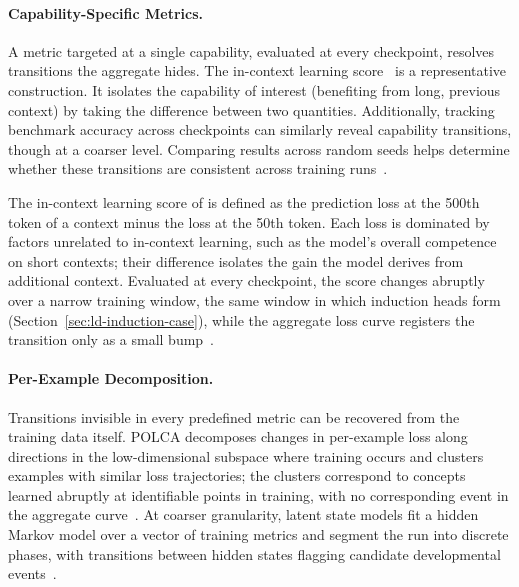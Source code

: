 \paragraph{Capability-Specific Metrics.} A metric targeted at a single capability, evaluated at every checkpoint, resolves transitions the aggregate hides. The in-context learning score~ is a representative construction. It isolates the capability of interest (benefiting from long, previous context) by taking the difference between two quantities. Additionally, tracking benchmark accuracy across checkpoints can similarly reveal capability transitions, though at a coarser level. Comparing results across random seeds helps determine whether these transitions are consistent across training runs~.

\begin{examplebox}
The in-context learning score of  is defined as the prediction loss at the 500th token of a context minus the loss at the 50th token. Each loss is dominated by factors unrelated to in-context learning, such as the model's overall competence on short contexts; their difference isolates the gain the model derives from additional context. Evaluated at every checkpoint, the score changes abruptly over a narrow training window, the same window in which induction heads form (Section~\ref{sec:ld-induction-case}), while the aggregate loss curve registers the transition only as a small bump~.
\end{examplebox}

\paragraph{Per-Example Decomposition.} Transitions invisible in every predefined metric can be recovered from the training data itself. POLCA decomposes changes in per-example loss along directions in the low-dimensional subspace where training occurs and clusters examples with similar loss trajectories; the clusters correspond to concepts learned abruptly at identifiable points in training, with no corresponding event in the aggregate curve~. At coarser granularity, latent state models fit a hidden Markov model over a vector of training metrics and segment the run into discrete phases, with transitions between hidden states flagging candidate developmental events~.

